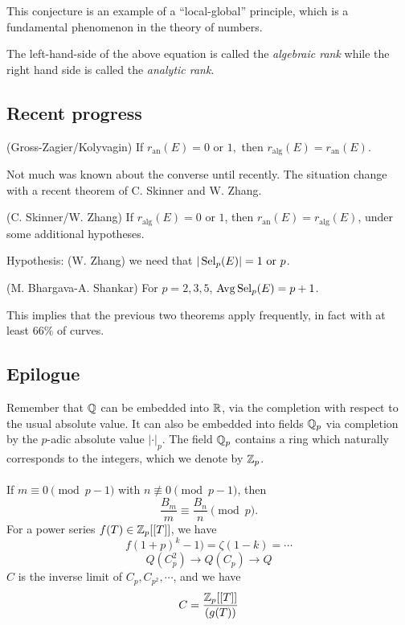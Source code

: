 \documentclass[12pt,amsfont]{amsart}
\begin{document}
This conjecture is an example of a ``local-global'' principle, which is a fundamental phenomenon in the theory of numbers.

\begin{rmk} The left-hand-side of the above equation is called the \emph{algebraic rank} while the right hand side is called the \emph{analytic rank}. 
\end{rmk}

\subsection{Recent progress}

\begin{thm} (Gross-Zagier/Kolyvagin) If $r_{\text{an}}(E) = 0 \text{ or } 1,$ then $r_{\text{alg}}(E) = r_{\text{an}}(E)$.
\end{thm}

Not much was known about the converse until recently. The situation change with a recent theorem of C. Skinner and W. Zhang.

\begin{thm} (C. Skinner/W. Zhang) If $r_{\text{alg}}(E) = 0 \text{ or } 1$, then $r_{\text{an}}(E) = r_{\text{alg}}(E)$, under some additional hypotheses.
\end{thm}

Hypothesis: (W. Zhang) we need that $|\operatorname{Sel}_p(E)| = 1 \text{ or } p$. 

\begin{thm} (M. Bhargava-A. Shankar) For $p = 2, 3, 5$, $\operatorname{Avg}\operatorname{Sel}_p(E) = p+1$.
\end{thm}

This implies that the previous two theorems apply frequently, in fact with at least $66\%$ of curves. 

\subsection{Epilogue}

Remember that ${\mathbb Q}$ can be embedded into ${\mathbb R}$, via the completion with respect to the usual absolute value. It can also be embedded into fields ${\mathbb Q}_p$ via completion by the $p$-adic absolute value $|\cdot|_p$. The field ${\mathbb Q}_p$ contains a ring which naturally corresponds to the integers, which we denote by ${\mathbb Z}_p$. \\ \\
If $m \equiv 0 \pmod{p-1}$ with $n \not \equiv 0 \pmod{p-1}$, then
\[\frac{B_m}{m} \equiv \frac{B_n}{n} \pmod{p}.\]
For a power series $f(T) \in {\mathbb Z}_p[[T]]$, we have
\[f(1+p)^k - 1) = \zeta(1-k) = \cdots \]
\[Q(C_p^2) \rightarrow Q(C_p) \rightarrow Q\]
$C$ is the inverse limit of $C_p, C_{p^2}, \cdots$, and we have
\[C = \frac{{\mathbb Z}_p[[T]]}{(g(T))}\]
\end{document}
